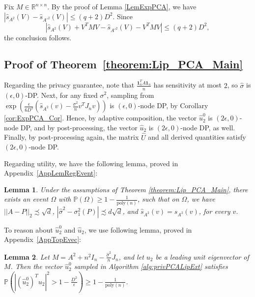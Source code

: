 \documentclass{article}
\newtheorem{lemma}{Lemma}
\newcommand{\sigmahat}{\ensuremath{\widehat{\sigma}}}
\begin{document}
Fix $M \in \mathbb{R}^{n \times n}$. By the proof of Lemma \ref{LemExpPCA}, we have $
|\widehat{s}_{A^2}(V) - \widehat{s}_{A'^2}(V)| \le (q+2)D^2$. Since
\begin{equation*}
|\widehat{s}_{A^2}(V) + V^TMV - \widehat{s}_{A'^2}(V) - V^TMV| \le (q+2)D^2,
\end{equation*}
the conclusion follows.


\subsection{Proof of Theorem~\ref{theorem:Lip_PCA_Main}}
\label{AppLipPCA}

Regarding the privacy guarantee, note that $\frac{\textbf{1}_n^T A\textbf{1}_n}{n}$ has sensitivity at most $2$, so $\sigmahat$ is $(\epsilon, 0)$-DP. Next, for any fixed $\sigma^2$, sampling from $\exp\left(\frac{\epsilon}{6D^2} (\widehat{s}_{A^2}(v) - \frac{\sigma^2}{n}v^TJ_nv)\right)$ is $(\epsilon, 0)$-node DP, by Corollary \ref{cor:ExpPCA_Cor}. Hence, by adaptive composition, the vector $\hat{u}_2^0$ is $(2\epsilon, 0)$-node DP, and by post-processing, the vector $\hat{u}_2$ is $(2\epsilon, 0)$-node DP, as well. Finally, by post-processing again, the matrix $\hat{U}$ and all derived quantities satisfy $(2\epsilon, 0)$-node DP.

Regarding utility, we have the following lemma, proved in Appendix~\ref{AppLemRegEvent}:

\begin{lemma}
\label{lemma:reg_event_PCA}
Under the assumptions of Theorem \ref{theorem:Lip_PCA_Main}, there exists an event $\Omega$ with $\mathbb{P}(\Omega)\ge 1 - \frac{1}{\mathrm{poly}(n)}$, such that on $\Omega$, we have $||A - P||_2 \precsim \sqrt{d}$, $|\sigmahat^2-\sigma_1^2(P)| \precsim d\sqrt{d}$, and $\widehat{s}_{A^2}(v) = s_{A^2}(v)$, for every $v$.
\end{lemma}

To reason about $\hat{u}_2^0$ and $\hat{u}_2$, we use following lemma, proved in Appendix~\ref{AppTopEvec}:

\begin{lemma}
\label{lemma:conc_top_evec_PCA}
Let $M = A^2+n^2I_n-\frac{\sigmahat^2}{n}J_n$, and let $u_2$ be a leading unit eigenvector of $M$. Then the vector $\hat u_2^0$ sampled in Algorithm \ref{alg:privPCALipExt} satisfies $\mathbb{P}\left(|(\hat u_2^0)^Tu_2|^2 > 1 - \frac{D^2}{\epsilon}\right) \geq 1 - \frac{1}{\mathrm{poly}(n)}$.
\end{lemma}
\end{document}
